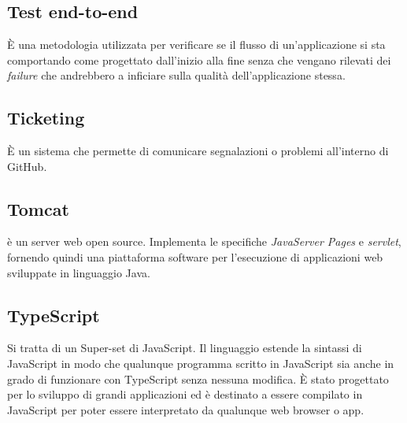 \section{}
\subsection*{Test end-to-end} È una metodologia utilizzata per verificare se il flusso di un’applicazione si sta comportando come progettato dall’inizio alla fine senza che vengano rilevati dei \textit{failure} che andrebbero a inficiare sulla qualità dell’applicazione stessa.

\subsection*{Ticketing} È un sistema che permette di comunicare segnalazioni o problemi all'interno di GitHub.

\subsection*{Tomcat} è un server web open source. Implementa le specifiche \textit{JavaServer Pages} e \textit{servlet}, fornendo quindi una piattaforma software per l'esecuzione di applicazioni web sviluppate in linguaggio Java.

\subsection*{TypeScript} Si tratta di un Super-set di JavaScript. Il linguaggio estende la sintassi di JavaScript in modo che qualunque programma scritto in JavaScript sia anche in grado di funzionare con TypeScript senza nessuna modifica. È stato progettato per lo sviluppo di grandi applicazioni ed è destinato a essere compilato in JavaScript per poter essere interpretato da qualunque web browser o app.